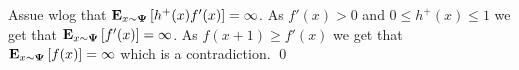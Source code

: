 \documentclass{article}[12pt]
\begin{document}
Assue wlog that ${\bf E}_{x \sim {\bf \Psi}}\left[ h^+(x) f'(x) \right]=\infty$. As
$f'(x)>0$ and $0 \leq h^+(x) \leq 1$ we get that ${\bf E}_{x \sim
  {\bf \Psi}}\left[ f'(x) \right]=\infty$.
As $f(x+1) \geq f'(x)$ we get that ${\bf E}_{x \sim
  {\bf \Psi}}\left[ f(x) \right]=\infty$ which is a contradiction.
\qed

\end{document}

